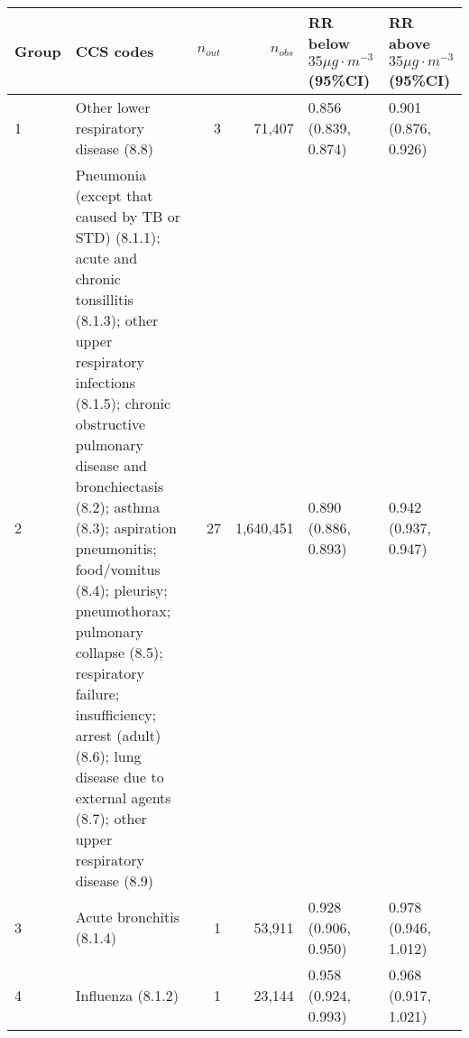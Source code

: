 \begin{tabular}{lp{7.6cm}rrp{2.2cm}p{2.2cm}}
  \hline
Group & CCS codes & $n_{out}$ & $n_{obs}$ & RR below $35 \mu g \cdot m^{-3}$ (95\%CI) & RR above $35 \mu g \cdot m^{-3}$ (95\%CI) \\ 
  \hline
   1 & Other lower respiratory disease (8.8) &    3 & 71,407 & 0.856 (0.839, 0.874) & 0.901 (0.876, 0.926) \\ 
     2 & Pneumonia (except that caused by TB or STD) (8.1.1); acute and chronic tonsillitis (8.1.3); other upper respiratory infections (8.1.5); chronic obstructive pulmonary disease and bronchiectasis (8.2); asthma (8.3); aspiration pneumonitis; food/vomitus (8.4); pleurisy; pneumothorax; pulmonary collapse (8.5); respiratory failure; insufficiency; arrest (adult) (8.6); lung disease due to external agents (8.7); other upper respiratory disease (8.9) &   27 & 1,640,451 & 0.890 (0.886, 0.893) & 0.942 (0.937, 0.947) \\ 
     3 & Acute bronchitis (8.1.4) &    1 & 53,911 & 0.928 (0.906, 0.950) & 0.978 (0.946, 1.012) \\ 
     4 & Influenza (8.1.2) &    1 & 23,144 & 0.958 (0.924, 0.993) & 0.968 (0.917, 1.021) \\ 
   \hline
\end{tabular}

